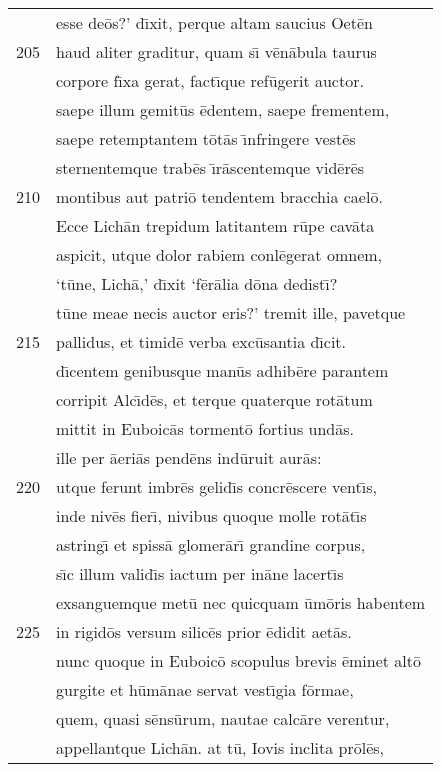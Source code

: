 \documentclass[paper=6in:9in,pagesize=pdftex,
               headinclude=on,footinclude=on,12pt]{scrbook}
\begin{document}
\begin{longtable}[p]{ r l }
 & esse de\=os?' d\={\i}xit, perque altam saucius Oet\=en\\ 
205 & haud aliter graditur, quam s\={\i} v\=en\=abula taurus\\ 
 & corpore f\={\i}xa gerat, fact\={\i}que ref\=ugerit auctor.\\ 
 & saepe illum gemit\=us \=edentem, saepe frementem,\\ 
 & saepe retemptantem t\=ot\=as \={\i}nfringere vest\=es\\ 
 & sternentemque trab\=es \={\i}r\=ascentemque vid\=er\=es\\ 
210 & montibus aut patri\=o tendentem bracchia cael\=o.\\ 
 & \indent Ecce Lich\=an trepidum latitantem r\=upe cav\=ata\\ 
 & aspicit, utque dolor rabiem conl\=egerat omnem,\\ 
 & `t\=une, Lich\=a,' d\={\i}xit `f\=er\=alia d\=ona dedist\={\i}?\\ 
 & t\=une meae necis auctor eris?' tremit ille, pavetque\\ 
215 & pallidus, et timid\=e verba exc\=usantia d\={\i}cit.\\ 
 & d\={\i}centem genibusque man\=us adhib\=ere parantem\\ 
 & corripit Alc\={\i}d\=es, et terque quaterque rot\=atum\\ 
 & mittit in Euboic\=as torment\=o fortius und\=as.\\ 
 & ille per \=aeri\=as pend\=ens ind\=uruit aur\=as:\\ 
220 & utque ferunt imbr\=es gelid\={\i}s concr\=escere vent\={\i}s,\\ 
 & inde niv\=es fier\={\i}, nivibus quoque molle rot\=at\={\i}s\\ 
 & astring\={\i} et spiss\=a glomer\=ar\={\i} grandine corpus,\\ 
 & s\={\i}c illum valid\={\i}s iactum per in\=ane lacert\={\i}s\\ 
 & exsanguemque met\=u nec quicquam \=um\=oris habentem\\ 
225 & in rigid\=os versum silic\=es prior \=edidit aet\=as.\\ 
 & nunc quoque in Euboic\=o scopulus brevis \=eminet alt\=o\\ 
 & gurgite et h\=um\=anae servat vest\={\i}gia f\=ormae,\\ 
 & quem, quasi s\=ens\=urum, nautae calc\=are verentur,\\ 
 & appellantque Lich\=an. at t\=u, Iovis inclita pr\=ol\=es,\\ 

\end{longtable}
\end{document}
